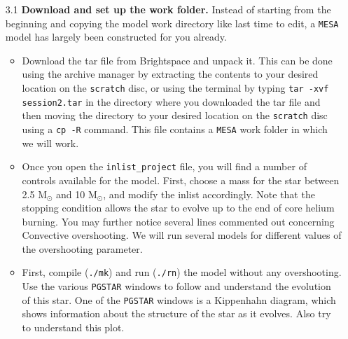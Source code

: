 \documentclass[11pt,a4paper]{article}
\begin{document}
\begin{enumerate}

\item[3.1] \textbf{Download and set up the work folder.} 
Instead of starting from the beginning and copying the model work directory like last time to edit, a \texttt{MESA} model has largely been constructed for you already. 

\begin{itemize}
    \item Download the tar file from Brightspace and unpack it. This can be done using the archive manager by extracting the contents to your desired location on the \texttt{scratch} disc, or using the terminal by typing \verb|tar -xvf session2.tar| in the directory where you downloaded the tar file and then moving the directory to your desired location on the \texttt{scratch} disc using a \texttt{cp -R} command. This file contains a \texttt{MESA} work folder in which we will work. 



    \item Once you open the \verb|inlist_project| file, you will find a number of controls available for the model. First, choose a mass for the star between 2.5 M$_\odot$ and 10 M$_\odot$, and modify the inlist accordingly. Note that the stopping condition allows the star to evolve up to the end of core helium burning. You may further notice several lines commented out concerning Convective overshooting. We will run several models for different values of the overshooting parameter. 

    \item First, compile (\verb|./mk|) and run (\verb|./rn|) the model without any overshooting. 
    Use the various \texttt{PGSTAR} windows to follow and understand the evolution of this star. One of the \texttt{PGSTAR} windows is a Kippenhahn diagram, which shows information about the structure of the star as it evolves. Also try to understand this plot.



\end{itemize}
\end{enumerate}
\end{document}

